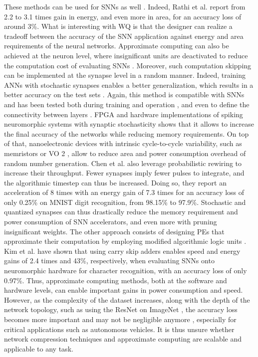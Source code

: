 These methods can be used for SNNs as well \cite{jin2017performance, rathi2018stdp}. Indeed, Rathi et al. \cite{rathi2018stdp} report from 2.2 to 3.1 times gain in energy, and even more in area, for an accuracy loss of around 3\%. What is interesting with WQ is that the designer can realize a tradeoff between the accuracy of the SNN application against energy and area requirements of the neural networks. Approximate computing can also be achieved at the neuron level, where insignificant units are deactivated to reduce the computation cost of evaluating SNNs \cite{sen2017approximate}.
Moreover, such computation skipping can be implemented at the synapse level in a random manner. Indeed, training ANNs with stochastic synapses enables a better generalization, which results in a better accuracy on the test sets \cite{srivastava2014dropout, wan2013regularization}. Again, this method is compatible with SNNs and has been tested both during training \cite{neftci2016stochastic, srinivasan2016magnetic} and operation \cite{buesing2011neural}, and even to define the connectivity between layers \cite{bellec2017deep, chen20184096}. FPGA \cite{sheik2016synaptic} and hardware \cite{jerry2017ultra} implementations of spiking neuromorphic systems with synaptic stochasticity shows that it allows to increase the final accuracy of the networks while reducing memory requirements. On top of that, nanoelectronic devices with intrinsic cycle-to-cycle variability, such as memristors \cite{knag2014native} or VO 2 \cite{jerry2017ultra}, allow to reduce area and power consumption overhead of random number generation. Chen et al. \cite{chen20184096} also leverage probabilistic rewiring to increase their throughput. Fewer synapses imply fewer pulses to integrate, and the algorithmic timestep can thus be increased. Doing so, they report an acceleration of 8 times with an energy gain of 7.3 times for an accuracy loss of only 0.25\% on MNIST digit recognition, from 98.15\% to 97.9\%. Stochastic and quantized synapses can thus drastically reduce the memory requirement and power consumption of SNN accelerators, and even more with pruning insignificant weights.
The other approach consists of designing PEs that approximate their computation by employing modified algorithmic logic units \cite{han2013approximate}. Kim et al. \cite{kim2013energy} have shown that using carry skip adders enables speed and energy gains of 2.4 times and 43\%, respectively, when evaluating SNNs onto neuromorphic hardware for character recognition, with an accuracy loss of only 0.97\%.
Thus, approximate computing methods, both at the software and hardware levels, can enable important gains in power consumption and speed. However, as the complexity of the dataset increases, along with the depth of the network topology, such as using the ResNet \cite{he2016deep} on ImageNet \cite{russakovsky2015imagenet}, the accuracy loss becomes more important and may not be negligible anymore \cite{rastegari2016xnor}, especially for critical applications such as autonomous vehicles. It is thus unsure whether network compression techniques and approximate computing are scalable and applicable to any task.
